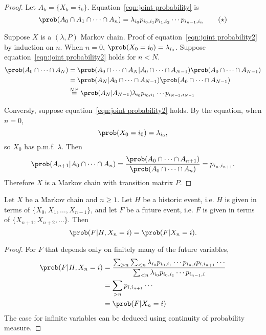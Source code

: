\documentclass[a4paper]{article}
\begin{document}
\begin{proof}
  Let $A_k = \{X_k=i_k\}$. Equation~\eqref{eqn:joint probability} is
\begin{equation}
  \label{eqn:joint probability2}
  \prob(A_0\cap A_1 \cap \cdots \cap A_n) = \lambda_{i_0} p_{i_0,i_1} p_{i_1,i_2} \cdots p_{i_{n-1}, i_n}
  \tag{$\star$}
\end{equation}

Suppose $X$ is a $(\lambda,P)$ Markov chain. Proof of equation~\eqref{eqn:joint probability2} by induction on $n$. When $n=0$, $\prob(X_0=i_0)=\lambda_{i_0}$. Suppose equation~\eqref{eqn:joint probability2} holds for $n<N$.
\begin{align*}
  \prob(A_0\cap\cdots\cap A_N) &= \prob(A_0\cap\cdots \cap A_N|A_0\cap\cdots\cap A_{N-1}) \prob(A_0\cap\cdots \cap A_{N-1}) \\
                            &= \prob(A_N|A_0\cap\cdots\cap A_{N-1})\prob(A_0\cap\cdots\cap A_{N-1}) \\
                            &\stackrel{\text{MP}}{=} \prob(A_N|A_{N-1}) \lambda_{i_0} p_{i_0,i_1} \cdots p_{i_{N-2},i_{N-1}}
  \end{align*}

Conversly, suppose equation~\eqref{eqn:joint probability2} holds. By the equation, when $n=0$,
\[
  \prob(X_0=i_0) = \lambda_{i_0},
\]
so $X_0$ has p.m.f. $\lambda$. Then
\[
  \prob(A_{n+1}|A_0\cap\cdots\cap A_n) = \frac{\prob(A_0\cap\cdots\cap A_{n+1})}{\prob(A_0\cap\dots\cap A_n)} = p_{i_n,i_{n+1}}.
    \]
    Therefore $X$ is a Markov chain with transition matrix $P$.
\end{proof}

\begin{theorem}
  Let $X$ be a Markov chain and $n\geq1$. Let $H$ be a historic event, i.e. $H$ is given in terms of $\{X_0,X_1,\ldots,X_{n-1}\}$, and let $F$ be a future event, i.e. $F$ is given in terms of $\{X_{n+1},X_{n+2},\ldots\}$. Then
  \[
    \prob(F|H, X_n=i) = \prob(F|X_n=i).
  \]
\end{theorem}

\begin{proof}
  For $F$ that depends only on finitely many of the future variables,
  \begin{align*}
    \prob(F|H,X_n=i) &= \frac{\sum_{>n}\sum_{<n}\lambda_{i_0}p_{i_0,i_1}\cdots p_{i_n,i}p_{i,i_{n+1}}\cdots}{\sum_{<n} \lambda_{i_0}p_{i_0,i_1}\cdots p_{i_{n-1},i}} \\
                  &= \sum_{>n} p_{i,i_{n+1}} \cdots \\
                  &= \prob(F|X_n=i)
  \end{align*}
  The case for infinite variables can be deduced using continuity of probability measure.
\end{proof}
\end{document}

